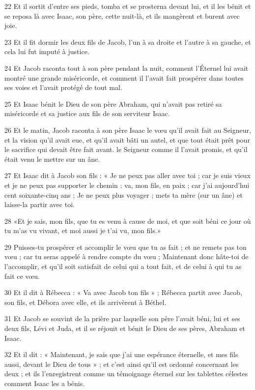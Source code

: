 \par 22 Et il sortit d'entre ses pieds, tomba et se prosterna devant lui, et il les bénit et se reposa là avec Isaac, son père, cette nuit-là, et ils mangèrent et burent avec joie.
\par 23 Et il fit dormir les deux fils de Jacob, l'un à sa droite et l'autre à sa gauche, et cela lui fut imputé à justice.
\par 24 Et Jacob raconta tout à son père pendant la nuit, comment l'Éternel lui avait montré une grande miséricorde, et comment il l'avait fait prospérer dans toutes ses voies et l'avait protégé de tout mal.
\par 25 Et Isaac bénit le Dieu de son père Abraham, qui n'avait pas retiré sa miséricorde et sa justice aux fils de son serviteur Isaac.
\par 26 Et le matin, Jacob raconta à son père Isaac le vœu qu'il avait fait au Seigneur, et la vision qu'il avait eue, et qu'il avait bâti un autel, et que tout était prêt pour le sacrifice qui devait être fait avant. le Seigneur comme il l'avait promis, et qu'il était venu le mettre sur un âne.
\par 27 Et Isaac dit à Jacob son fils : « Je ne peux pas aller avec toi ; car je suis vieux et je ne peux pas supporter le chemin : va, mon fils, en paix ; car j'ai aujourd'hui cent soixante-cinq ans ; Je ne peux plus voyager ; mets ta mère (sur un âne) et laisse-la partir avec toi.
\par 28 «Et je sais, mon fils, que tu es venu à cause de moi, et que soit béni ce jour où tu m'as vu vivant, et moi aussi je t'ai vu, mon fils.»
\par 29 Puisses-tu prospérer et accomplir le vœu que tu as fait ; et ne remets pas ton vœu ; car tu seras appelé à rendre compte du vœu ; Maintenant donc hâte-toi de l'accomplir, et qu'il soit satisfait de celui qui a tout fait, et de celui à qui tu as fait ce vœu.
\par 30 Et il dit à Rébecca : « Va avec Jacob ton fils » ; Rébecca partit avec Jacob, son fils, et Débora avec elle, et ils arrivèrent à Béthel.
\par 31 Et Jacob se souvint de la prière par laquelle son père l'avait béni, lui et ses deux fils, Lévi et Juda, et il se réjouit et bénit le Dieu de ses pères, Abraham et Isaac.
\par 32 Et il dit : « Maintenant, je sais que j'ai une espérance éternelle, et mes fils aussi, devant le Dieu de tous » ; et c'est ainsi qu'il est ordonné concernant les deux ; et ils l'enregistrent comme un témoignage éternel sur les tablettes célestes comment Isaac les a bénis.

